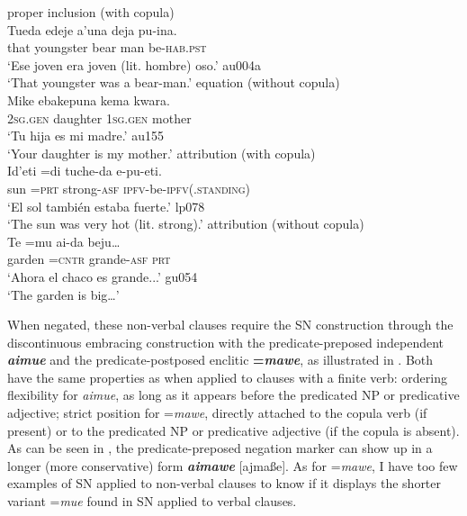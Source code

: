 \documentclass[output=paper]{langsci/langscibook}
\begin{document}
\begin{exe}\ex\label{ex:tacana-bearman-mother}
\begin{xlist}
\ex\label{ex:tacana-bearman} 
proper inclusion (with copula)\\
\gll {}Tueda edeje{\cb} a'una deja{\cb} pu-ina.\\
    that  youngster  bear  man  be-\textsc{hab.pst}\\
\glt`Ese joven era joven (lit. hombre) oso.' au004a\\
`That youngster was a bear-man.'
\ex\label{ex:tacana-mother} 
 equation (without copula)\\
\gll {}Mike ebakepuna{\cb} kema kwara{\cb}.\\
 \textsc{2sg.gen}  daughter  \textsc{1sg.gen}  mother\\
\glt `Tu hija es mi madre.' au155\\
`Your daughter is my mother.'
\ex\label{ex:tacana-veryhot}
 attribution (with copula)\\
\gll {}Id'eti  =di tuche-da e-pu-eti.\\
    sun  =\textsc{prt}  strong-\textsc{asf}
    \textsc{ipfv}-be-\textsc{ipfv(.standing)}\\
\glt `El sol también estaba fuerte.' lp078\\
`The sun was very hot (lit. strong).' 
\ex\label{ex:tacana-garden}
 attribution (without copula)\\
\gll {}Te  =mu ai-da  beju…\\
    garden  =\textsc{cntr}  grande-\textsc{asf}  \textsc{prt}\\
\glt `Ahora el chaco es grande...' gu054\\
`The garden is big…' 
\end{xlist}\end{exe}

When negated, these non-verbal clauses require the SN construction through
the discontinuous embracing construction with the predicate-preposed
independent \textbf{\textit{aimue}} and the predicate-postposed enclitic
\textbf{=\textit{mawe}}, as illustrated in .
Both have the same properties as when applied to clauses with a finite
verb: ordering flexibility for \textit{aimue}, as long as it appears before
the predicated NP or predicative adjective; strict position for
=\textit{mawe}, directly attached to the copula verb (if present) or to the
predicated NP or predicative adjective (if the copula is absent). As can be
seen in , the predicate-preposed negation marker can show up in a longer (more conservative) form \textbf{\textit{aimawe}} [ajmaße].  As for =\textit{mawe}, I have too few examples of SN applied to non-verbal clauses to know if it displays the shorter variant =\textit{mue} found in SN applied to verbal clauses.
\end{document}
